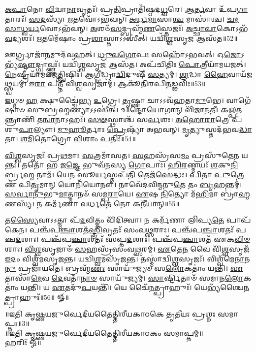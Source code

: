    \ul{𑌅}\-\-\ul{𑌪𑌾}\-𑌨𑍋 \ul{𑌵𑌿}\-𑌦𑍍𑌵𑌾\-\ul{𑌨𑌾}\-𑌵𑍃𑌤𑌃᳴।
   𑌪𑍍𑌰\-\ul{𑌤𑌿}\-𑌪𑍍𑌰𑌾𑌤𑌿᳴𑌷𑍍𑌠𑌦\-\ul{𑌧𑍍𑌵}\-𑌰𑍇।
   \ul{𑌆}\-\-\ul{𑌰𑍍𑌤}\-𑌵𑌾 𑌉᳴𑌪\-\ul{𑌗𑌾}\-𑌤𑌾𑌰𑌃᳴।
   \ul{𑌸}\-\-\ul{𑌦}\-𑌸𑍍𑌯𑌾᳴ \ul{𑌋}\-𑌤𑌵𑍋᳴𑌽𑌭𑌵𑌨𑍍।
   \ul{𑌅}\-\-\ul{𑌰𑍍𑌧}\-\-\ul{𑌮𑌾}\-𑌸𑌾\-\ul{𑌶𑍍𑌚} 𑌮𑌾𑌸𑌾॑𑌶𑍍𑌚।
   \ul{𑌚}\-\-\ul{𑌮}\-\-\ul{𑌸𑌾}\-\-\ul{𑌧𑍍𑌵}\-\-\ul{𑌰𑍍𑌯}\-𑌵𑍋𑌽𑌭᳴𑌵𑌨𑍍।
   \ul{𑌅}\-𑌶𑍞᳴\-\ul{𑌸}\-𑌦𑍍𑌬𑍍𑌰𑌹𑍍𑌮᳴\-\ul{𑌣}\-𑌸𑍍𑌤𑍇𑌜𑌃᳴।
   \ul{𑌅}\-\-\ul{𑌚𑍍𑌛𑌾}\-\-\ul{𑌵𑌾}\-𑌕𑍋𑌽𑌭᳴\-\ul{𑌵}\-𑌦𑍍𑌯𑌶𑌃᳴।
   \ul{𑌋}\-𑌤𑌮𑍇᳴𑌷𑌾𑌂 𑌪𑍍𑌰\-\ul{𑌶𑌾}\-𑌸𑍍𑌤𑌾𑌽𑌽𑌸𑍀॑𑌤𑍍।
   𑌯𑌦𑍍𑌵𑌿᳴\-\ul{𑌶𑍍𑌵}\-𑌸𑍃\-\ul{𑌜} 𑌆𑌸᳴𑌤॥52॥

   𑌊𑌰𑍍𑌗𑍍𑌰𑌾𑌜𑌾᳴\-\ul{𑌨}\-𑌮𑍁𑌦᳴𑌵𑌹𑌤𑍍।
   \ul{𑌧𑍍𑌰𑍁}\-\-\ul{𑌵}\-\-\ul{𑌗𑍋}\-𑌪𑌃 𑌸𑌹𑍋᳴𑌽𑌭𑌵𑌤𑍍।
   𑌓\-\ul{𑌜𑍋}\-𑌽𑌭𑍍𑌯᳴\-\ul{𑌷𑍍𑌟𑍗}\-\-𑌦𑍍𑌗𑍍𑌰𑌾𑌵𑍍𑌣𑍍𑌣𑌃᳴।
   𑌯𑌦𑍍𑌵𑌿᳴\-\ul{𑌶𑍍𑌵}\-𑌸𑍃\-\ul{𑌜} 𑌆𑌸᳴𑌤।
   𑌅𑌪᳴𑌚𑌿𑌤𑌿𑌃 \ul{𑌪𑍋}\-𑌤𑍍𑌰𑍀𑌯𑌾᳴𑌮𑌯𑌜𑌤𑍍।
   \ul{𑌨𑍇}\-𑌷𑍍𑌟𑍍𑌰𑍀𑌯𑌾᳴𑌮\-𑌯\-\ul{𑌜}\-𑌤𑍍𑌤𑍍𑌵𑌿𑌷𑌿𑌃᳴।
   𑌆𑌗𑍍𑌨𑍀॑𑌦𑍍𑌧𑍍𑌰𑌾\-\ul{𑌦𑍍𑌵𑌿}\-𑌦𑍁𑌷𑍀᳴ \ul{𑌸}\-𑌤𑍍𑌯𑌮𑍍।
   \ul{𑌶𑍍𑌰}\-𑌦𑍍𑌧𑌾 \ul{𑌹𑍈}\-𑌵𑌾\-𑌯᳴𑌜\-\ul{𑌥𑍍𑌸𑍍𑌵}\-𑌯𑌮𑍍।
   𑌇\-\ul{𑌰𑌾} 𑌪𑌤𑍍𑌨𑍀᳴ 𑌵𑌿\-\ul{𑌶𑍍𑌵}\-𑌸𑍃𑌜𑌾॑𑌮𑍍।
   𑌆𑌕𑍂᳴𑌤𑌿𑌰𑌪𑌿𑌨\-\-\ul{𑌡𑍍𑌢}\-𑌵𑌿𑌃॥53॥

   \ul{𑌇}\-𑌧𑍍𑌮𑍞 \ul{𑌹} 𑌕𑍍𑌷𑍁𑌚𑍍𑌚𑍈॑𑌭𑍍𑌯 \ul{𑌉}\-𑌗𑍍𑌰𑍇।
   \ul{𑌤𑍃}\-𑌷𑍍𑌣𑌾 𑌚𑌾𑌽𑌽𑌵᳴𑌹𑌤𑌾\-\ul{𑌮𑍁}\-𑌭𑍇।
   𑌵𑌾𑌗𑍇᳴𑌷𑌾𑍞 𑌸𑍁𑌬𑍍𑌰\-\ul{𑌹𑍍𑌮}\-\-𑌣𑍍𑌯𑌾𑌽𑌽𑌸𑍀॑𑌤𑍍।
   \ul{𑌛}\-\-\ul{𑌨𑍍𑌦𑍋}\-\-\ul{𑌯𑍋}\-𑌗𑌾𑌨𑍍 𑌵𑌿᳴𑌜𑌾\-\ul{𑌨}\-𑌤𑍀।
   \ul{𑌕}\-\-\ul{𑌲𑍍𑌪}\-\-\ul{𑌤}\-𑌨𑍍𑌤𑍍𑌰𑌾𑌣𑌿᳴ 𑌤\-\ul{𑌨𑍍𑌵𑌾}\-𑌨𑌾𑌽𑌹𑌃᳴।
   \ul{𑌸}\-\-\ul{𑍟}\-𑌸𑍍𑌥𑌾𑌶𑍍𑌚᳴ 𑌸\-\ul{𑌰𑍍𑌵}\-𑌶𑌃।
   \ul{𑌅}\-\-\ul{𑌹𑍋}\-\-\ul{𑌰𑌾}\-𑌤𑍍𑌰𑍇 𑌪᳴𑌶𑍁\-\ul{𑌪𑌾}\-𑌲𑍍𑌯𑍗।
   \ul{𑌮𑍁}\-\-\ul{𑌹𑍂}\-𑌰𑍍𑌤𑌾𑌃 \ul{𑌪𑍍𑌰𑍇}\-𑌷𑍍𑌯𑌾᳴ 𑌅𑌭𑌵𑌨𑍍।
   \ul{𑌮𑍃}\-𑌤𑍍𑌯𑍁𑌸𑍍𑌤𑌦᳴𑌭𑌵\-\ul{𑌦𑍍𑌧𑌾}\-𑌤𑌾।
   \ul{𑌶}\-\-\ul{𑌮𑌿}\-𑌤𑍋𑌗𑍍𑌰𑍋 \ul{𑌵𑌿}\-𑌶𑌾𑌂 𑌪𑌤𑌿𑌃᳴॥54॥

   \ul{𑌵𑌿}\-\-\ul{𑌶𑍍𑌵}\-𑌸𑍃𑌜𑌃᳴ 𑌪𑍍𑌰\-\ul{𑌥}\-𑌮𑌾𑌃 \ul{𑌸}\-𑌤𑍍𑌰𑌮𑌾᳴𑌸𑌤।
   \ul{𑌸}\-𑌹𑌸𑍍𑌰᳴𑌸\-\ul{𑌮𑌂} 𑌪𑍍𑌰𑌸𑍁᳴𑌤𑍇\-\ul{𑌨} 𑌯𑌨𑍍𑌤𑌃᳴।
   𑌤𑌤𑍋᳴ 𑌹 𑌜\-\ul{𑌜𑍍𑌞𑍇} 𑌭𑍁𑌵᳴𑌨𑌸𑍍𑌯 \ul{𑌗𑍋}\-𑌪𑌾𑌃।
   \ul{𑌹𑌿}\-\-\ul{𑌰}\-𑌣𑍍𑌮𑌯𑌃᳴ \ul{𑌶}\-𑌕𑍁\-\ul{𑌨𑌿}\-𑌰𑍍𑌬𑍍𑌰\-\ul{𑌹𑍍𑌮}\- 𑌨𑌾𑌮᳴।
   𑌯𑍇\-\ul{𑌨} 𑌸𑍂\-\ul{𑌰𑍍𑌯}\-𑌸𑍍𑌤𑌪᳴\-\ul{𑌤𑌿} 𑌤𑍇𑌜᳴\-\ul{𑌸𑍇}\-𑌦𑍍𑌧𑌃।
   \ul{𑌪𑌿}\-𑌤𑌾 \ul{𑌪𑍁}\-𑌤𑍍𑌰𑍇𑌣᳴ 𑌪𑌿\-\ul{𑌤𑍃}\-𑌮𑌾𑌨𑍍 𑌯𑍋𑌨𑌿᳴𑌯𑍋𑌨𑍗।
   𑌨𑌾𑌵𑍇᳴𑌦𑌵𑌿𑌨𑍍𑌮𑌨𑍁\-\ul{𑌤𑍇} 𑌤𑌂 \ul{𑌬𑍃}\-𑌹𑌨𑍍𑌤𑌮𑍍॑।
   \ul{𑌸}\-\-\ul{𑌰𑍍𑌵𑌾}\-\-\ul{𑌨𑍁}\-𑌭𑍁\-\ul{𑌮𑌾}\-𑌤𑍍𑌮𑌾𑌨𑍞᳴ 𑌸𑌮𑍍𑌪\-\ul{𑌰𑌾}\-𑌯𑍇।
   \ul{𑌏}\-𑌷 \ul{𑌨𑌿}\-𑌤𑍍𑌯𑍋 𑌮᳴\-\ul{𑌹𑌿}\-𑌮𑌾 𑌬𑍍𑌰𑌾॑\-\ul{𑌹𑍍𑌮}\-𑌣𑌸𑍍𑌯᳴।
   𑌨 𑌕𑌰𑍍𑌮᳴𑌣𑌾 𑌵𑌰𑍍𑌧\-\ul{𑌤𑍇} 𑌨𑍋 𑌕𑌨𑍀᳴𑌯𑌾𑌨𑍍॥55॥

   𑌤\-\ul{𑌸𑍍𑌯𑍈}\-𑌵𑌾𑌽𑌽𑌤𑍍𑌮𑌾 𑌪᳴\-\ul{𑌦}\-𑌵𑌿𑌤𑍍𑌤𑌂 𑌵𑌿᳴𑌦𑌿𑌤𑍍𑌵𑌾।
   𑌨 𑌕𑌰𑍍𑌮᳴𑌣𑌾 𑌲𑌿𑌪𑍍𑌯\-\ul{𑌤𑍇} 𑌪𑌾𑌪᳴𑌕𑍇𑌨।
   𑌪𑌞𑍍𑌚᳴𑌪\-\ul{𑌞𑍍𑌚𑌾}\-𑌶𑌤᳴\-\ul{𑌸𑍍𑌤𑍍𑌰𑌿}\-𑌵𑍃𑌤𑌃᳴ 𑌸𑌂𑌵\-\ul{𑌥𑍍𑌸}\-𑌰𑌾𑌃।
   𑌪𑌞𑍍𑌚᳴𑌪\-\ul{𑌞𑍍𑌚𑌾}\-𑌶𑌤𑌃᳴ 𑌪𑌞𑍍𑌚\-\ul{𑌦}\-𑌶𑌾𑌃।
   𑌪𑌞𑍍𑌚᳴𑌪\-\ul{𑌞𑍍𑌚𑌾}\-𑌶𑌤𑌃᳴ 𑌸𑌪𑍍𑌤\-\ul{𑌦}\-𑌶𑌾𑌃।
   𑌪𑌞𑍍𑌚᳴𑌪\-\ul{𑌞𑍍𑌚𑌾}\-𑌶𑌤᳴ 𑌏𑌕\-\ul{𑌵𑌿}\-\-\ul{𑍞}\-𑌶𑌾𑌃।
   \ul{𑌵𑌿}\-\-\ul{𑌶𑍍𑌵}\-𑌸𑍃𑌜𑌾𑍞᳴ \ul{𑌸}\-𑌹𑌸𑍍𑌰᳴𑌸𑌂𑌵𑌥𑍍𑌸𑌰𑌮𑍍।
   \ul{𑌏}\-𑌤𑍇\-\ul{𑌨} 𑌵𑍈 𑌵𑌿᳴\-\ul{𑌶𑍍𑌵}\-𑌸𑍃𑌜᳴ \ul{𑌇}\-𑌦𑌂 𑌵𑌿𑌶𑍍𑌵᳴𑌮𑌸𑍃𑌜𑌨𑍍𑌤।
   𑌯𑌦𑍍𑌵𑌿\-\ul{𑌶𑍍𑌵}\-𑌮𑌸𑍃᳴𑌜𑌨𑍍𑌤।
   𑌤𑌸𑍍𑌮𑌾॑𑌦𑍍𑌵𑌿\-\ul{𑌶𑍍𑌵}\-𑌸𑍃𑌜𑌃᳴।
   𑌵𑌿𑌶𑍍𑌵᳴𑌮𑍇\-\ul{𑌨𑌾}\-𑌨\-\ul{𑌨𑍁} 𑌪𑍍𑌰𑌜𑌾᳴𑌯𑌤𑍇।
   𑌬𑍍𑌰𑌹𑍍𑌮᳴\-\ul{𑌣𑌃} 𑌸𑌾𑌯𑍁᳴𑌜𑍍𑌯𑍞 𑌸\-\ul{𑌲𑍋}\-𑌕𑌤𑌾𑌂॑ 𑌯𑌨𑍍𑌤𑌿।
   \ul{𑌏}\-𑌤𑌾𑌸𑌾᳴\-\ul{𑌮𑍇}\-𑌵 \ul{𑌦𑍇}\-𑌵𑌤𑌾᳴\-\ul{𑌨𑌾}\-\-\ul{𑍞} 𑌸𑌾𑌯𑍁᳴𑌜𑍍𑌯𑌮𑍍।
   \ul{𑌸𑌾}\-𑌰𑍍𑌷𑍍𑌟𑌿𑌤𑌾𑍞᳴ 𑌸𑌮𑌾𑌨\-\ul{𑌲𑍋}\-𑌕𑌤𑌾𑌂॑ 𑌯𑌨𑍍𑌤𑌿।
   𑌯 \ul{𑌏}\-𑌤𑌦𑍁᳴\-\ul{𑌪}\-𑌯𑌨𑍍𑌤𑌿᳴।
   𑌯𑍇 𑌚𑍈᳴\-\ul{𑌨}\-𑌤𑍍𑌪𑍍𑌰𑌾𑌹𑍁𑌃᳴।
   𑌯𑍇𑌭𑍍𑌯᳴𑌶𑍍𑌚𑍈\-\ul{𑌨}\-𑌤𑍍𑌪𑍍𑌰𑌾𑌹𑍁𑌃᳴॥56॥
 𑍐॥
   \anuvakamend

      \begin{center}
॥𑌇𑌤𑌿 𑌕𑍃𑌷𑍍𑌣𑌯𑌜𑍁𑌰𑍍𑌵𑍇𑌦𑍀𑌯𑌤𑍈𑌤𑍍𑌤𑌿𑌰𑍀𑌯𑌕𑌾𑌠𑌕𑍇 𑌤𑍃𑌤𑍀𑌯𑌃 𑌪𑍍𑌰𑌶𑍍𑌨𑌃 𑌸𑌮𑌾𑌪𑍍𑌤𑌃॥3॥\\
॥𑌇𑌤𑌿 𑌕𑍃𑌷𑍍𑌣𑌯𑌜𑍁𑌰𑍍𑌵𑍇𑌦𑍀𑌯𑌤𑍈𑌤𑍍𑌤𑌿𑌰𑍀𑌯𑌕𑌾𑌠𑌕𑌂 𑌸𑌮𑌾𑌪𑍍𑌤𑌮𑍍॥\\
   𑌹𑌰𑌿𑌃᳴  𑍐॥
\end{center}
